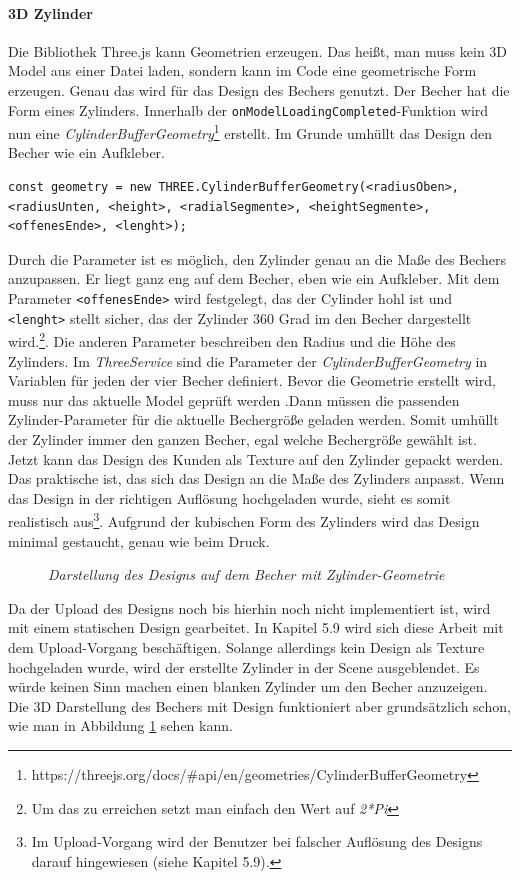 \paragraph{3D Zylinder}
Die Bibliothek Three.js kann Geometrien erzeugen. Das heißt, man muss kein 3D Model aus einer Datei laden, sondern kann im Code eine geometrische Form erzeugen. Genau das wird für das Design des Bechers genutzt. Der Becher hat die Form eines Zylinders. Innerhalb der \texttt{onModelLoadingCompleted}-Funktion wird nun eine \textit{CylinderBufferGeometry}\footnote{https://threejs.org/docs/\#api/en/geometries/CylinderBufferGeometry} erstellt. Im Grunde umhüllt das Design den Becher wie ein Aufkleber.
%
\begin{lstlisting}
const geometry = new THREE.CylinderBufferGeometry(<radiusOben>, <radiusUnten, <height>, <radialSegmente>, <heightSegmente>, <offenesEnde>, <lenght>);
\end{lstlisting}
%
Durch die Parameter ist es möglich, den Zylinder genau an die Maße des Bechers anzupassen. Er liegt ganz eng auf dem Becher, eben wie ein Aufkleber. Mit dem Parameter \texttt{<offenesEnde>} wird festgelegt, das der Cylinder hohl ist und \texttt{<lenght>} stellt sicher, das der Zylinder 360 Grad im den Becher dargestellt wird.\footnote{Um das zu erreichen setzt man einfach den Wert auf \textit{2*Pi }}. Die anderen Parameter beschreiben den Radius und die Höhe des Zylinders. Im \textit{ThreeService} sind die Parameter der \textit{CylinderBufferGeometry} in Variablen für jeden der vier Becher definiert. Bevor die Geometrie erstellt wird, muss nur das aktuelle Model geprüft werden .Dann müssen die passenden Zylinder-Parameter für die aktuelle Bechergröße geladen werden. Somit umhüllt der Zylinder immer den ganzen Becher, egal welche Bechergröße gewählt ist.\\
Jetzt kann das Design des Kunden als Texture auf den Zylinder gepackt werden. Das praktische ist, das sich das Design an die Maße des Zylinders anpasst. Wenn das Design in der richtigen Auflösung hochgeladen wurde, sieht es somit realistisch aus\footnote{Im Upload-Vorgang wird der Benutzer bei falscher Auflösung des Designs darauf hingewiesen (siehe Kapitel 5.9).}. Aufgrund der kubischen Form des Zylinders wird das Design minimal gestaucht, genau wie beim Druck.
\begin{figure}[h]
	\centering
	{}
	\caption[Konfigurator mit designtem Becher]{\textit{Darstellung des Designs auf dem Becher mit Zylinder-Geometrie}}
	\label{fig:bechermitdesign}
\end{figure}
Da der Upload des Designs noch bis hierhin noch nicht implementiert ist, wird mit einem statischen Design gearbeitet. In Kapitel 5.9 wird sich diese Arbeit mit dem Upload-Vorgang beschäftigen. Solange allerdings kein Design als Texture hochgeladen wurde, wird der erstellte Zylinder in der Scene ausgeblendet. Es würde keinen Sinn machen einen blanken Zylinder um den Becher anzuzeigen. Die 3D Darstellung des Bechers mit Design funktioniert aber grundsätzlich schon, wie man in Abbildung \ref{fig:bechermitdesign} sehen kann.
%
